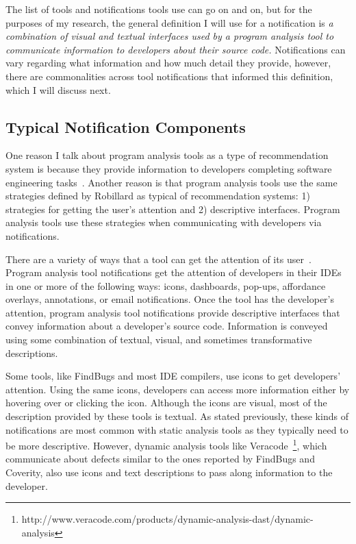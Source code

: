 The list of tools and notifications tools use can go on and on, but for the purposes of my research, the general definition I will use for a notification is \emph{a combination of visual and textual interfaces used by a program analysis tool to communicate information to developers about their source code.} Notifications can vary regarding what information and how much detail they provide, however, there are commonalities across tool notifications that informed this definition, which I will discuss next.

\subsection{Typical Notification Components}
One reason I talk about program analysis tools as a type of recommendation system is because they provide information to developers completing software engineering tasks~\cite{robillard2014recommendation}. 
Another reason is that program analysis tools use the same strategies defined by Robillard as typical of recommendation systems: 1) strategies for getting the user's attention and 2) descriptive interfaces.
Program analysis tools use these strategies when communicating with developers via notifications.

There are a variety of ways that a tool can get the attention of its user~\cite{robillard2014recommendation}. Program analysis tool notifications get the attention of developers in their IDEs in one or more of the following ways: icons, dashboards, pop-ups, affordance overlays, annotations, or email notifications.
Once the tool has the developer's attention, program analysis tool notifications provide descriptive interfaces that convey information about a developer's source code. 
Information is conveyed using some combination of textual, visual, and sometimes transformative descriptions.

Some tools, like FindBugs and most IDE compilers, use icons to get developers' attention. Using the same icons, developers can access more information either by hovering over or clicking the icon. Although the icons are visual, most of the description provided by these tools is textual. As stated previously, these kinds of notifications are most common with static analysis tools as they typically need to be more descriptive. However, dynamic analysis tools like Veracode~\footnote{http://www.veracode.com/products/dynamic-analysis-dast/dynamic-analysis}, which communicate about defects similar to the ones reported by FindBugs and Coverity, also use icons and text descriptions to pass along information to the developer.

